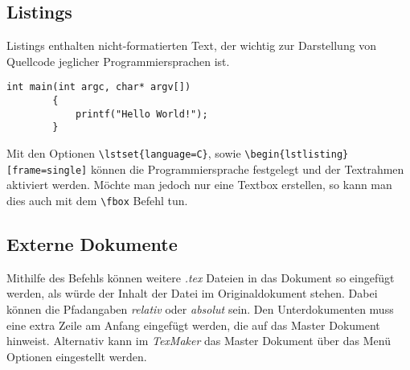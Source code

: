 \documentclass[10pt]{article}  %
\begin{document}
    \subsection{Listings}
        Listings enthalten nicht-formatierten Text, der wichtig zur Darstellung von Quellcode jeglicher Programmiersprachen ist.
    \lstset{language=C}
    \begin{lstlisting}[frame=single]
        int main(int argc, char* argv[]) 
        {
            printf("Hello World!");
        }
    \end{lstlisting}
    Mit den Optionen \verb!\lstset{language=C}!, sowie \verb!\begin{lstlisting}[frame=single]! können die Programmiersprache festgelegt und der Textrahmen aktiviert werden.
    Möchte man jedoch nur eine Textbox erstellen, so kann man dies auch mit dem \verb!\fbox! Befehl tun.

    \subsection{Externe Dokumente}
        Mithilfe des \verb!! Befehls können weitere \emph{.tex} Dateien in das Dokument so eingefügt werden, als würde der Inhalt der Datei im Originaldokument stehen.
        Dabei können die Pfadangaben \emph{relativ} oder \emph{absolut} sein. Den Unterdokumenten muss eine extra Zeile am Anfang eingefügt werden, die auf das Master Dokument hinweist. Alternativ kann im \emph{TexMaker}
        das Master Dokument über das Menü Optionen eingestellt werden.
\end{document}
